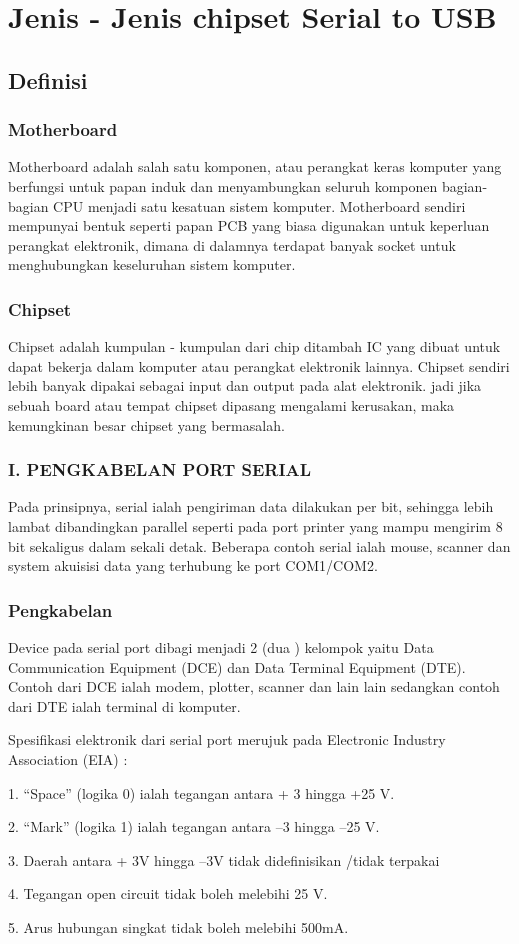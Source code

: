 \section{Jenis - Jenis chipset Serial to USB}
\subsection{Definisi}
\subsubsection{Motherboard}
Motherboard adalah salah satu komponen, atau perangkat keras komputer yang berfungsi  untuk papan induk dan menyambungkan seluruh komponen bagian-bagian CPU menjadi satu kesatuan sistem komputer. Motherboard sendiri  mempunyai  bentuk seperti  papan PCB yang biasa digunakan untuk keperluan perangkat elektronik, dimana di dalamnya terdapat banyak socket untuk menghubungkan keseluruhan sistem komputer.
\subsubsection{Chipset}
Chipset adalah kumpulan - kumpulan dari chip ditambah IC yang dibuat untuk dapat bekerja dalam komputer atau perangkat elektronik lainnya.
Chipset sendiri lebih banyak dipakai sebagai input dan output pada alat elektronik. jadi jika sebuah board atau tempat chipset dipasang mengalami kerusakan, maka kemungkinan besar chipset yang bermasalah.

\subsubsection{I. PENGKABELAN PORT SERIAL}

Pada prinsipnya, serial ialah pengiriman data dilakukan per bit, sehingga lebih lambat dibandingkan parallel seperti pada port printer yang mampu mengirim 8 bit sekaligus dalam sekali detak. Beberapa contoh serial ialah mouse, scanner dan system akuisisi data yang terhubung ke port COM1/COM2.

\subsubsection{Pengkabelan}
Device pada serial port dibagi menjadi 2 (dua ) kelompok yaitu Data Communication Equipment (DCE) dan Data Terminal Equipment (DTE). Contoh dari DCE ialah modem, plotter, scanner dan lain lain sedangkan contoh dari DTE ialah terminal di komputer.

Spesifikasi elektronik dari serial port merujuk pada Electronic Industry Association (EIA) :

1. “Space” (logika 0) ialah tegangan antara + 3 hingga +25 V.

2. “Mark” (logika 1) ialah tegangan antara –3 hingga –25 V.

3. Daerah antara + 3V hingga –3V tidak didefinisikan /tidak terpakai

4. Tegangan open circuit tidak boleh melebihi 25 V.

5. Arus hubungan singkat tidak boleh melebihi 500mA.
